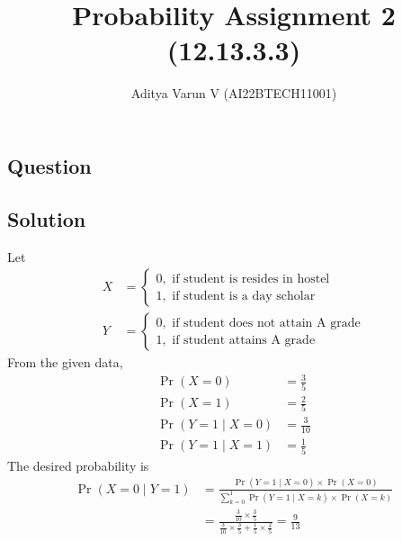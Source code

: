 \documentclass[12pt,onecolumn,notitlepage]{article}
\title{Probability Assignment 2 (12.13.3.3)}
\author{Aditya Varun V (AI22BTECH11001)}
\date{}
\providecommand{\pr}[1]{\ensuremath{\Pr\left(#1\right)}}
\begin{document}
\maketitle
\subsection*{Question}


\subsection*{Solution}
\fi

Let 
\begin{align}
	X &=  \begin{cases}
     0, \text{ if student is resides in hostel}\\
     1, \text{ if student is a day scholar} 
 \end{cases}\\
	Y &=  \begin{cases}
     0, \text{ if student does not attain A grade}\\
     1, \text{ if student attains A grade} 
 \end{cases}
\end{align}
From the given data, 
\begin{align}
	\pr{X=0} &= \frac{3}{5}\\
	\pr{X=1} &= \frac{2}{5}\\
	\pr{Y=1 \mid X=0} &= \frac{3}{10}\\
	\pr{Y=1 \mid X=1} &= \frac{1}{5}
\end{align}
 The desired probability is
 \begin{align}
	 \pr{X=0 \mid Y=1} &= \frac{\pr{Y=1 \mid X=0}\times\pr{X=0}}{\sum_{k=0}^{1}\pr{Y=1 \mid X=k}\times\pr{X=k} }\\
 	&= \frac{\frac{3}{10}\times\frac{3}{5}}{\frac{3}{10}\times\frac{3}{5} + \frac{1}{5}\times\frac{2}{5}}
 	= \frac{9}{13}
 \end{align}
\end{document}

